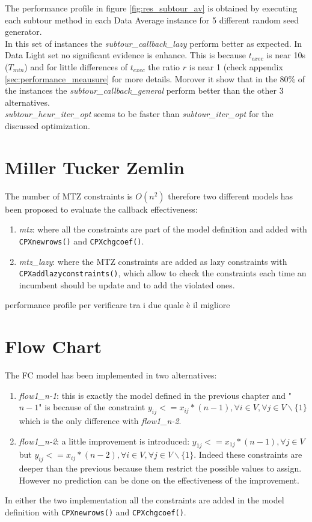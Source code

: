 The performance profile in figure \ref{fig:res_subtour_av} is obtained by executing each subtour method in each Data Average instance for 5 different random seed generator. \\
In this set of instances the \textit{subtour\_callback\_lazy} perform better as expected. In Data Light set no significant evidence is enhance. This is because $ t_{exec} $ is near 10s ($ T_{min} $) and for little differences of $ t_{exec} $ the ratio $ r $ is near 1 (check appendix \ref{sec:performance_meausure} for more details.
Morover it show that in the $ 80\%  $  of the instances the \textit{subtour\_callback\_general} perform better than the other 3 alternatives.\\
\textit{subtour\_heur\_iter\_opt} seems to be faster than \textit{subtour\_iter\_opt} for the discussed optimization. 


\section{Miller Tucker Zemlin}
The number of MTZ constraints is $O(n^2)$ therefore two different models has been proposed to evaluate the callback effectiveness:
\begin{enumerate}
	\item \textit{mtz}: where all the constraints are part of the model definition and added with \texttt{CPXnewrows()} and \texttt{CPXchgcoef()}. 
	\item \textit{mtz\_lazy}: where the MTZ constraints are added as lazy constraints with \texttt{CPXaddlazyconstraints()}, which allow to check the constraints each time an incumbent should be update and to add the violated ones.
\end{enumerate}

performance profile per verificare tra i due quale è il migliore


\section{Flow Chart}
The FC model has been implemented in two alternatives:
\begin{enumerate}
	\item \textit{flow1\_n-1}: this is exactly the model defined in the previous chapter and "$ n-1 $" is because of  the constraint  $ y_{ij} <= x_{ij}*(n-1), \forall i \in V, \forall j \in V \backslash \{1\} $ which is the only difference with \textit{flow1\_n-2}. 
	\item \textit{flow1\_n-2}: a little improvement is introduced: $ y_{1j} <= x_{1j}*(n-1), \forall j \in V $ but $ y_{ij} <= x_{ij}*(n-2), \forall i \in V, \forall j \in V \backslash \{1\} $. Indeed these constraints are deeper than the previous because them restrict the possible values to assign. However no prediction can be done on the effectiveness of the improvement.
\end{enumerate}
In either the two implementation all the constraints are added in the model definition with \texttt{CPXnewrows()} and \texttt{CPXchgcoef()}.


